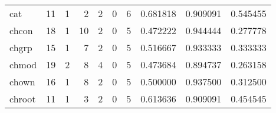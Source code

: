 \begin{longtable}{lrrrrrrrrr}
cat       &                                      11 &                                                  1 &                                                  2 &                                                  2 &                                                  0 &                                                  6 &                                           0.681818 &                               0.909091 &                             0.545455 \\
chcon     &                                      18 &                                                  1 &                                                 10 &                                                  2 &                                                  0 &                                                  5 &                                           0.472222 &                               0.944444 &                             0.277778 \\
chgrp     &                                      15 &                                                  1 &                                                  7 &                                                  2 &                                                  0 &                                                  5 &                                           0.516667 &                               0.933333 &                             0.333333 \\
chmod     &                                      19 &                                                  2 &                                                  8 &                                                  4 &                                                  0 &                                                  5 &                                           0.473684 &                               0.894737 &                             0.263158 \\
chown     &                                      16 &                                                  1 &                                                  8 &                                                  2 &                                                  0 &                                                  5 &                                           0.500000 &                               0.937500 &                             0.312500 \\
chroot    &                                      11 &                                                  1 &                                                  3 &                                                  2 &                                                  0 &                                                  5 &                                           0.613636 &                               0.909091 &                             0.454545 \\

\end{longtable}
